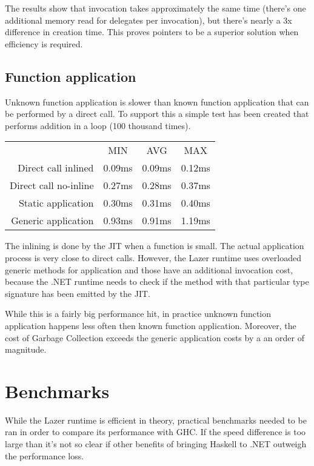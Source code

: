 \documentclass[en]{pracamgr}
\begin{document}
The results show that invocation takes approximately the same time
(there's one additional memory read for delegates per invocation),
but there's nearly a 3x difference in creation time.
This proves pointers to be a superior solution
when efficiency is required.

\subsection{Function application}\label{perf:application}

Unknown function application is slower than known function
application that can be performed by a direct call.
To support this a simple test has been created that performs
addition in a loop (100 thousand times).

\begin{center}
\begin{tabular}{r c c c}
    & MIN & AVG & MAX \\
    \cline{2-4}

    Direct call inlined & 0.09ms & 0.09ms & 0.12ms \\
    Direct call no-inline & 0.27ms & 0.28ms & 0.37ms \\
    Static application & 0.30ms & 0.31ms & 0.40ms \\
    Generic application & 0.93ms & 0.91ms & 1.19ms \\
\end{tabular}
\end{center}

The inlining is done by the JIT when a function is small.
The actual application process is very close to direct calls.
However, the Lazer runtime uses overloaded generic methods for application
and those have an additional invocation cost,
because the .NET runtime needs to check if the method
with that particular type signature has been emitted by the JIT.

While this is a fairly big performance hit, in practice
unknown function application happens less often then
known function application. Moreover, the cost of Garbage Collection
exceeds the generic application costs by a an order of magnitude.

\section{Benchmarks}\label{s:benchmarks}

While the Lazer runtime is efficient in theory,
practical benchmarks needed to be ran in order to
compare its performance with GHC. If the speed difference
is too large than it's not so clear if other benefits
of bringing Haskell to .NET outweigh the performance loss.
\end{document}
